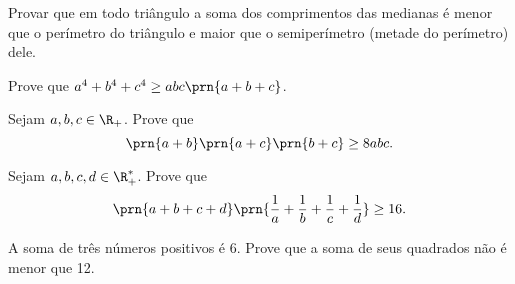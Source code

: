 \begin{exercise}
Provar que em todo triângulo a soma dos comprimentos das
medianas é menor que o perímetro do triângulo e maior que o
semiperímetro (metade do perímetro) dele.
\end{exercise}

\begin{exercise}
Prove que $a^4 +b^4 +c^4 \geq abc \prn{a+b+c}$.
\end{exercise}

\begin{exercise}
Sejam $a, b, c \in \R_+$. Prove que $$\prn {a+b} \prn {a+c}
\prn {b+c} \geq 8abc.$$
\end{exercise}

\begin{exercise}
Sejam $a, b, c, d \in \R_+^*$. Prove que $$\prn {a+b+c+d}
\prn {\frac 1 a + \frac 1 b + \frac 1 c + \frac 1 d} \geq 16.$$
\end{exercise}


\begin{exercise}
A soma de três números positivos é 6. Prove que a soma de seus
quadrados não é menor que 12.
\end{exercise}
